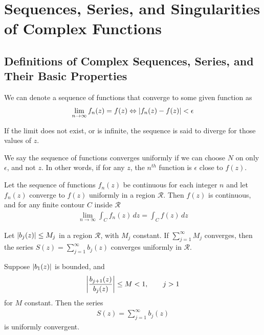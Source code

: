 \section{Sequences, Series, and Singularities of Complex Functions}
    \subsection{Definitions of Complex Sequences, Series, and Their Basic
    Properties}
    We can denote a sequence of functions that converge to some given
    function as
    \begin{align*}
        \lim_{n\to\infty} f_n(z) = f(z) \Leftrightarrow
        \left\lvert f_n(z) - f(z) \right\rvert < \epsilon
    \end{align*}

    If the limit does not exist, or is infinite, the sequence is said to
    diverge for those values of $z$.

    We say the sequence of functions converges uniformly if we can choose
    $N$ on only $\epsilon$, and not $z$. In other words, if for any $z$, the
    $n^{th}$ function is $\epsilon$ close to $f(z)$.

    \begin{thm}
        Let the sequence of functions $f_n(z)$ be continuous for each
        integer $n$ and let $f_n(z)$ converge to $f(z)$ uniformly in a
        region $\mathcal{R}$. Then $f(z)$ is continuous, and for any finite
        contour $C$ inside $\mathcal{R}$
        \begin{align*}
            \lim_{n\to\infty} \int_C f_n(z) \, dz = \int_C f(z) \, dz
        \end{align*}
    \end{thm}

    \begin{thm}
        Let $\left\lvert b_j(z) \right\rvert \le M_j$ in a region $\mathcal{R}$, with $M_j$
        constant. If $\sum_{j=1}^\infty M_j$ converges, then the series
        $S(z)=\sum_{j=1}^\infty b_j(z)$ converges uniformly in
        $\mathcal{R}$.
    \end{thm}

    \begin{thm}
        Suppose $\left\lvert b_1(z) \right\rvert$ is bounded, and
        \begin{align*}
            \left\lvert \frac{b_{j+1}(z)}{b_j(z)} \right\rvert \le M < 1, \qquad j > 1
        \end{align*}
        for $M$ constant. Then the series
        \begin{align*}
            S(z) = \sum_{j=1}^\infty b_j(z)
        \end{align*}
        is uniformly convergent.
    \end{thm}
